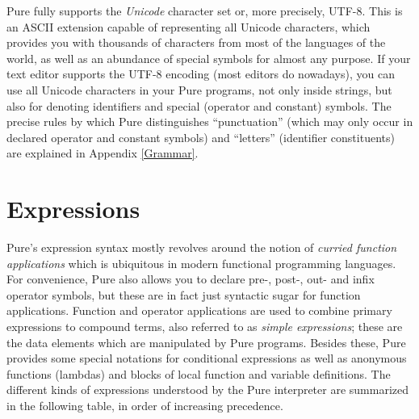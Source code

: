 \documentclass[a4paper,12pt]{article}
\begin{document}
Pure fully supports the \emph{Unicode} character set or, more precisely, UTF-8. This is an ASCII extension capable of representing all Unicode characters, which provides you with thousands of characters from most of the languages of the world, as well as an abundance of special symbols for almost any purpose. If your text editor supports the UTF-8 encoding (most editors do nowadays), you can use all Unicode characters in your Pure programs, not only inside strings, but also for denoting identifiers and special (operator and constant) symbols. The precise rules by which Pure distinguishes ``punctuation'' (which may only occur in declared operator and constant symbols) and ``letters'' (identifier constituents) are explained in Appendix \ref{Grammar}.

\section{Expressions}
\label{Expressions}

Pure's expression syntax mostly revolves around the notion of \emph{curried function applications} which is ubiquitous in modern functional programming languages. For convenience, Pure also allows you to declare pre-, post-, out- and infix operator symbols, but these are in fact just syntactic sugar for function applications. Function and operator applications are used to combine primary expressions to compound terms, also referred to as \emph{simple expressions}; these are the data elements which are manipulated by Pure programs. Besides these, Pure provides some special notations for conditional expressions as well as anonymous functions (lambdas) and blocks of local function and variable definitions. The different kinds of expressions understood by the Pure interpreter are summarized in the following table, in order of increasing precedence.
\end{document}
